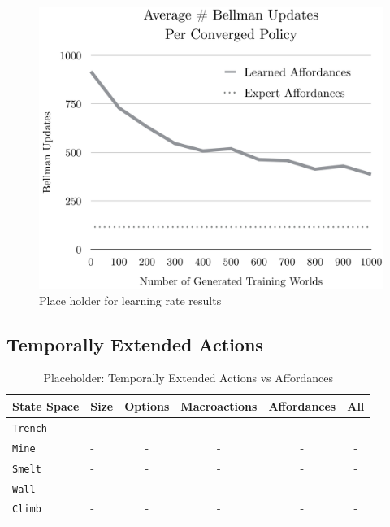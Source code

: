 \documentclass[conference]{IEEEtran}
\begin{document}
\begin{figure}[H]
\centering
\includegraphics[scale=0.195]{figures/training_results.png}%
  \caption{Place holder for learning rate results}
  \label{fig:training_results}
\end{figure}

\subsection{Temporally Extended Actions}

\begin{table}[H]
\centering
\begin{tabular}{ l l || c c c c }
  State Space 		&	Size 	&	Options 	& Macroactions & Affordances  & 	All 	\\ \hline
  \texttt{Trench}  	& 	-	&	-		&	-	&	-			&	-	\\
  \texttt{Mine}  		& 	-	&	-		&	-	&	-  			&	-	\\
  \texttt{Smelt}  		& 	-	&	-		&	-	&	-  			&	-	\\
  \texttt{Wall}  		& 	-	&	-		&	-	&	-			&	-	\\
  \texttt{Climb}  		& 	-	&	-		&	-	&	- 			&	-	\\
\end{tabular}
\caption{Placeholder: Temporally Extended Actions vs Affordances}
\label{table:minecraft_results_cpu}
\end{table}
\end{document}
